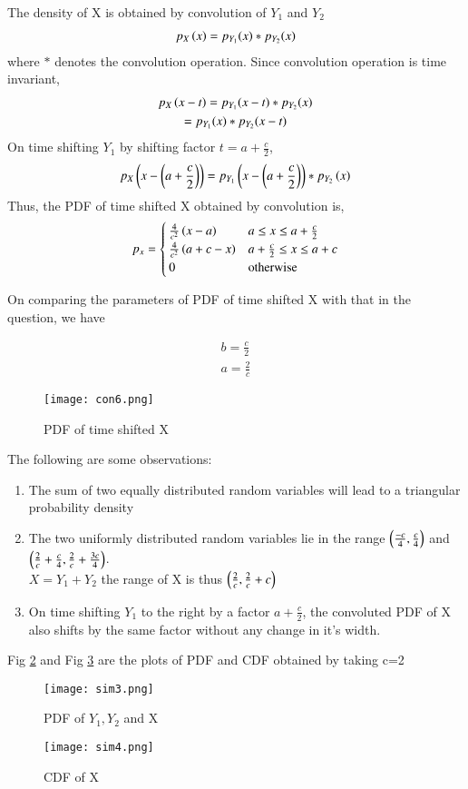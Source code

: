 \documentclass[journal,12pt,twocolumn]{IEEEtran}
\begin{document}
The density of X is obtained by convolution of $Y_1$ and $Y_2$
\begin{align}
p_X\left(x\right) = p_{Y_1}(x)*p_{Y_2}(x)
\end{align}
where $*$ denotes the convolution operation. Since convolution operation is time invariant, 
\begin{multline}
    p_X\left(x-t\right) = p_{Y_1}(x-t)*p_{Y_2}(x) \\ = p_{Y_1}(x)*p_{Y_2}(x-t)
\end{multline}
On time shifting $Y_1$ by shifting factor $t=a+\frac{c}{2}$, 
\begin{align}
    p_X\left(x-\left(a+\frac{c}{2}\right)\right) =  p_{Y_1}\left(x-\left(a+\frac{c}{2}\right)\right)*p_{Y_2}\left(x\right)
\end{align}
Thus, the PDF of time shifted X obtained by convolution is,
\begin{align}
p_x = 
\begin{cases}
\frac{4}{c^2}\left(x-a\right) & a \le x \le a+\frac{c}{2}\\
\frac{4}{c^2}\left(a+c-x\right) & a+\frac{c}{2} \le x \le a+c \\
0 & \text{otherwise}
\end{cases}
\end{align}

On comparing the parameters of PDF of time shifted X with that in the question, we have

\begin{align}
    b=\frac{c}{2}\\
    a=\frac{2}{c}
\end{align}


\begin{figure}[H]
\centering
\texttt{[image: con6.png]}
\caption{PDF of time shifted X}
\label{fig:con6}
\end{figure}
The following are some observations: 
\begin{enumerate}
    \item The sum of two equally distributed random variables will lead to a triangular probability density
    \item The two uniformly distributed random variables lie in the range $\left(\frac{-c}{4},\frac{c}{4}\right)$ and $\left(\frac{2}{c}+\frac{c}{4} , \frac{2}{c}+\frac{3c}{4}\right)$. \\
    \because $X = Y_1 + Y_2$ the range of X is thus $\left(\frac{2}{c},\frac{2}{c}+c\right)$
    \item On time shifting $Y_1$ to the right by a factor $a+\frac{c}{2}$, the convoluted PDF of X also shifts by the same factor without any change in it's width.
\end{enumerate}

Fig \ref{fig:sim3} and Fig \ref{fig:sim4} are the plots of PDF and CDF obtained by taking c=2
\begin{figure}[H]
\centering
\texttt{[image: sim3.png]}
\caption{PDF of $Y_1, Y_2$ and X}
\label{fig:sim3}
\end{figure}
\begin{figure}[H]
\centering
\texttt{[image: sim4.png]}
\caption{CDF of X}
\label{fig:sim4}
\end{figure}
\end{document}
